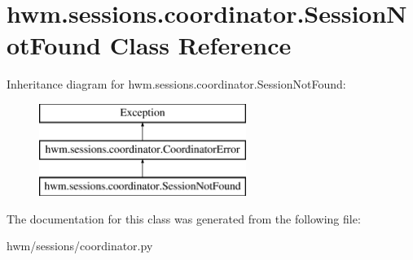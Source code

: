 \hypertarget{classhwm_1_1sessions_1_1coordinator_1_1_session_not_found}{\section{hwm.\-sessions.\-coordinator.\-Session\-Not\-Found Class Reference}
\label{classhwm_1_1sessions_1_1coordinator_1_1_session_not_found}
}
Inheritance diagram for hwm.\-sessions.\-coordinator.\-Session\-Not\-Found\-:\begin{figure}[H]
\begin{center}
\leavevmode
\includegraphics[height=3.000000cm]{classhwm_1_1sessions_1_1coordinator_1_1_session_not_found}
\end{center}
\end{figure}


The documentation for this class was generated from the following file\-:\begin{DoxyCompactItemize}
\item 
hwm/sessions/coordinator.\-py\end{DoxyCompactItemize}

